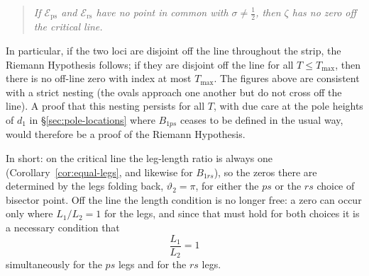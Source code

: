 \documentclass[11pt]{article}
\theoremstyle{definition}
\begin{document}
\begin{quote}
\emph{If $\mathcal{E}_{\mathrm{ps}}$ and $\mathcal{E}_{\mathrm{rs}}$ have no
point in common with $\sigma\neq\tfrac12$, then $\zeta$ has no zero off the
critical line.}
\end{quote}

In particular, if the two loci are disjoint off the line throughout the strip,
the Riemann Hypothesis follows; if they are disjoint off the line for all
$T\le T_{\max}$, then there is no off-line zero with index at most $T_{\max}$.
The figures above are consistent with a strict nesting (the ovals approach one
another but do not cross off the line). A proof that this nesting persists for
all $T$, with due care at the pole heights of $d_1$ in
\S\ref{sec:pole-locations} where $B_{1ps}$ ceases to be defined in
the usual way, would therefore be a proof of the Riemann Hypothesis.

In short: on the critical line the leg-length ratio is always one
(Corollary~\ref{cor:equal-legs}, and likewise for $B_{1rs}$), so the
zeros there are determined by the legs folding back,
$\vartheta_2=\pi$, for either the $ps$ or the $rs$ choice of bisector point.
Off the line the length condition is no longer free: a zero can occur only
where $L_1/L_2=1$ for the legs, and since that must hold for both choices it
is a necessary condition that
\begin{equation}\label{eq:both-ratios-one}
\frac{L_1}{L_2}=1
\end{equation}
simultaneously for the $ps$ legs and for the $rs$ legs.
\end{document}

